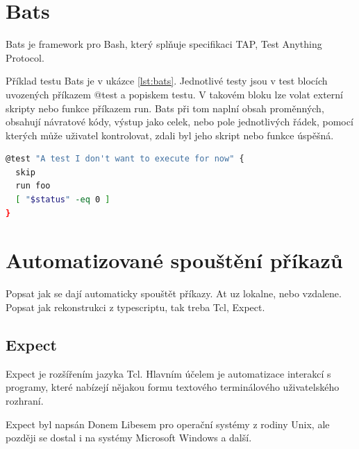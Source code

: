 \documentclass[thesis=M,czech]{FITthesis}[2012/06/26]
\begin{document}


\section{Bats}
Bats je framework pro Bash, který splňuje specifikaci TAP, Test Anything Protocol.

Příklad testu Bats je v ukázce \ref{lst:bats}. Jednotlivé testy jsou v test blocích uvozených příkazem @test a popiskem testu. V takovém bloku lze volat externí skripty nebo funkce příkazem run. Bats při tom naplní obsah proměnných, obsahují návratové kódy, výstup jako celek, nebo pole jednotlivých řádek, pomocí kterých může uživatel kontrolovat, zdali byl jeho skript nebo funkce úspěšná.

\begin{minipage}{\linewidth}
\begin{lstlisting}[language=bash, caption={Bats}, label={lst:bats}]
@test "A test I don't want to execute for now" {
  skip
  run foo
  [ "$status" -eq 0 ]
}
\end{lstlisting}
\end{minipage}




%
\section{Automatizované spouštění příkazů}

Popsat jak se dají automaticky spouštět příkazy. At uz lokalne, nebo vzdalene. Popsat jak rekonstrukci z typescriptu, tak treba Tcl, Expect.

\subsection{Expect}

Expect je rozšířením jazyka Tcl. Hlavním účelem je automatizace interakcí s programy, které nabízejí nějakou formu textového terminálového uživatelského rozhraní.

Expect byl napsán Donem Libesem pro operační systémy z rodiny Unix, ale později se dostal i na systémy Microsoft Windows a další.
\end{document}
